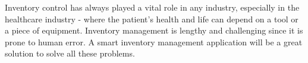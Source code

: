 
Inventory control has always played a vital role in any industry, especially in the healthcare industry - where the patient's health and life can depend on a tool or a piece of equipment. Inventory management is lengthy and challenging since it is prone to human error. A smart inventory management application will be a great solution to solve all these problems.